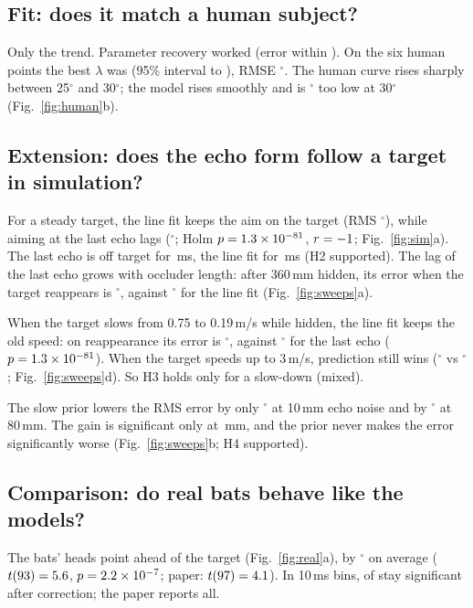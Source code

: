 \documentclass[10pt,twocolumn]{article}
\begin{document}
\subsection{Fit: does it match a human subject?}
Only the trend. Parameter recovery worked (error within \humanRecoveryMaxRelErr). On the six human points the best $\lambda$ was \humanLamFit{} (95\% interval \humanLamFitLo{} to \humanLamFitHi), RMSE \humanFitRMSE$^\circ$. The human curve rises sharply between 25$^\circ$ and 30$^\circ$; the model rises smoothly and is \humanFitMaxResid$^\circ$ too low at 30$^\circ$ (Fig.~\ref{fig:human}b).


\subsection{Extension: does the echo form follow a target in simulation?}
For a steady target, the line fit keeps the aim on the target (RMS \simSteadyRmsOurs$^\circ$), while aiming at the last echo lags (\simSteadyRmsNonpred$^\circ$; Holm $p=1.3\times 10^{-81}$, $r=-1$; Fig.~\ref{fig:sim}a). The last echo is off target for \simSteadyOffNonpred\,ms, the line fit for \simSteadyOffOurs\,ms (H2 supported). The lag of the last echo grows with occluder length: after 360\,mm hidden, its error when the target reappears is \simOcclThreeSixZeroExitNonpred$^\circ$, against \simOcclThreeSixZeroExitOurs$^\circ$ for the line fit (Fig.~\ref{fig:sweeps}a).

When the target slows from 0.75 to 0.19\,m/s while hidden, the line fit keeps the old speed: on reappearance its error is \simHiddenSlowExitOurs$^\circ$, against \simHiddenSlowExitNonpred$^\circ$ for the last echo ($p=1.3\times 10^{-81}$). When the target speeds up to 3\,m/s, prediction still wins (\simHiddenFastExitOurs$^\circ$ vs \simHiddenFastExitNonpred$^\circ$; Fig.~\ref{fig:sweeps}d). So H3 holds only for a slow-down (mixed).

The slow prior lowers the RMS error by only \simNoiseOneZeroGain$^\circ$ at 10\,mm echo noise and by \simNoiseEightZeroGain$^\circ$ at 80\,mm. The gain is significant only at \simPriorHelpsAt\,mm, and the prior never makes the error significantly worse (Fig.~\ref{fig:sweeps}b; H4 supported).



\subsection{Comparison: do real bats behave like the models?}
The bats' heads point ahead of the target (Fig.~\ref{fig:real}a), by \realLeadMeanDeg$^\circ$ on average ($t(93)=5.6$, $p=2.2\times 10^{-7}$; paper: $t(97)=4.1$). In 10\,ms bins, \realLeadSigBins{} of \realLeadBins{} stay significant after correction; the paper reports all.
\end{document}
